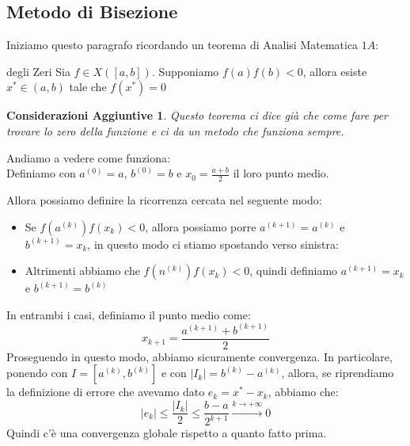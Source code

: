 \documentclass[11pt,a4paper,twoside]{article}
\newtheorem*{cons}{Considerazioni Aggiuntive}
\theoremstyle{definition}
\begin{document}
\subsection{Metodo di Bisezione}

Iniziamo questo paragrafo ricordando un teorema di Analisi Matematica $1A$:
\begin{thm}{degli Zeri}{}
	Sia $f \in X([a,b])$. Supponiamo $f(a)f(b)<0$, allora esiste $x^* \in (a,b)$ tale che $f(x^*) =0$
\end{thm}

\begin{cons}
	Questo teorema ci dice già che come fare per trovare lo zero della funzione e ci da un metodo che funziona sempre.
\end{cons}

Andiamo a vedere come funziona:\\
Definiamo con $a^{(0)} = a$, $b^{(0)} = b$ e $x_0 = \frac{a+b}2$ il loro punto medio.
\begin{center}
\end{center}
Allora possiamo definire la ricorrenza cercata nel seguente modo:
\begin{itemize}
	\item Se $f(a^{(k)})f(x_k)<0$, allora possiamo porre $a^{(k+1)} = a^{(k)}$ e $b^{(k+1)} = x_k$, in questo modo ci stiamo spostando verso sinistra:
	\begin{center}
	\end{center}
	\item Altrimenti abbiamo che $f(n^{(k)})f(x_k)<0$, quindi definiamo $a^{(k+1)} = x_k$ e $b^{(k+1)} = b^{(k)}$
	\begin{center}
	\end{center}
\end{itemize}
In entrambi i casi, definiamo il punto medio come:
\[ x_{k+1} = \frac{a^{(k+1)} + b^{(k+1)}}{2} \]
Proseguendo in questo modo, abbiamo sicuramente convergenza. In particolare, ponendo con $I = [a^{(k)}, b^{(k)}]$ e con $|I_k| = b^{(k)} - a^{(k)}$, allora, se riprendiamo la definizione di errore che avevamo dato $e_k = x^*-x_k$, abbiamo che:
\[ |e_k| \leq \frac{|I_k|}2 \leq \frac{b-a}{2^{k+1}} \xrightarrow{k \to +\infty} 0\]
Quindi c'è una convergenza globale rispetto a quanto fatto prima.
\end{document}
